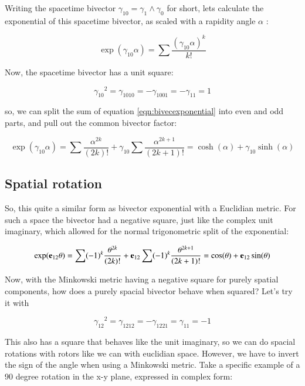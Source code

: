 \documentclass{article}      %
\begin{document}
Writing the spacetime bivector $\gamma_{10} = \gamma_1 \wedge \gamma_0$ for short, lets calculate the exponential of this spacetime bivector, as scaled with a rapidity 
angle $\alpha$ :

\begin{equation}\label{eqn:bivecexponential}
\exp(\gamma_{10}\alpha) = \sum \frac{(\gamma_{10}\alpha)^k}{k!}
\end{equation}

Now, the spacetime bivector has a unit square:

\begin{equation*}
{\gamma_{10}}^2 = \gamma_{1010} = -\gamma_{1001} = -\gamma_{11} = 1
\end{equation*}

so, we can split the sum of equation \ref{eqn:bivecexponential} into even and odd parts, and pull out the common bivector factor:

\begin{equation}\label{eqn:bivechyper}
\exp(\gamma_{10}\alpha) 
= \sum \frac{\alpha^{2k}}{(2k)!} + \gamma_{10}\sum \frac{\alpha^{2k+1}}{(2k+1)!}
= \cosh(\alpha) + \gamma_{10} \sinh(\alpha)
\end{equation}

\subsection{ Spatial rotation }

So, this quite a similar form as bivector exponential with a Euclidian metric.  For such a space the bivector had a negative square, just like the complex unit imaginary,
which allowed for the normal trigonometric split of the exponential: 

\begin{equation}
\exp(\mathbf{e}_{12}\theta) 
= \sum (-1)^k\frac{\theta^{2k}}{(2k)!} + \mathbf{e}_{12}\sum (-1)^k\frac{\theta^{2k+1}}{(2k+1)!}
= \cos(\theta) + \mathbf{e}_{12} \sin(\theta)
\end{equation}

Now, with the Minkowski metric having a negative square for purely spatial components, how does a purely spacial bivector behave when squared?  Let's try it with

\begin{equation*}
{\gamma_{12}}^2 
= \gamma_{1212}
= -\gamma_{1221}
= \gamma_{11}
= -1
\end{equation*}

This also has a square that behaves like the unit imaginary, so we can do spacial rotations with rotors like we can with euclidian space.  However, we have to invert the sign of the angle when using a Minkowski metric.  Take a specific example of a 90 degree rotation in the x-y plane, expressed in complex form:
\end{document}

